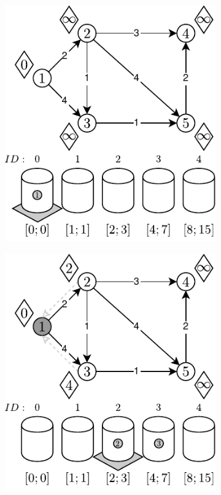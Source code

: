 \begin{figure}[!htbp]
	\centering
	\begin{subfigure}[b]{0.28\textwidth}
		\includegraphics[width=\textwidth]{Chapter_II/RADIX-HEAP-NC-Example/a.pdf}
		\caption{}
	\end{subfigure}
	\qquad
	\begin{subfigure}[b]{0.28\textwidth}
		\includegraphics[width=\textwidth]{Chapter_II/RADIX-HEAP-NC-Example/b.pdf}

\end{subfigure}
\end{figure}

